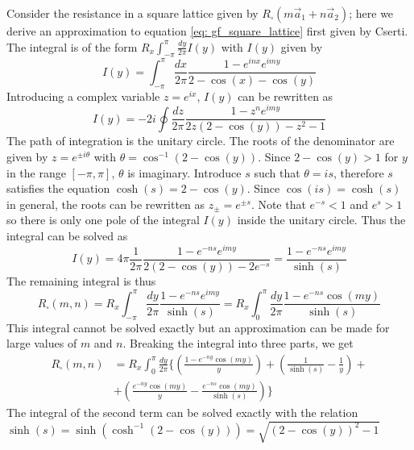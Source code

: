 Consider the resistance in a square lattice given by $R_{\square}(m \vec{a}_1 + n \vec{a}_2)$; here we derive an approximation to equation \ref{eq: gf_square_lattice} first given by Cserti\cite{cserti2000}. The integral is of the form $R_x \int_{-\pi}^{\pi} \frac{dy}{2 \pi}I(y)$ with $I(y)$ given by 
\begin{equation}
I(y) = \int_{-\pi}^{\pi} \frac{d x}{2 \pi}\frac{1 - e^{i n x}e^{i m y}}{2 - \cos(x) - \cos(y)}
\end{equation}
Introducing a complex variable $z = e^{i x}$, $I(y)$ can be rewritten as 
\begin{equation}
I(y) = - 2 i \oint \frac{d z}{2 \pi}\frac{1 - z^n e^{i m y}}{2z(2 - \cos(y)) - z^2 -1}
\end{equation}
The path of integration is the unitary circle. The roots of the denominator are given by $ z = e^{\pm i \theta}$ with $\theta = \cos^{-1}(2 - \cos(y))$. Since $2 - \cos(y)>1$ for $y$ in the range $[-\pi,\pi]$, $\theta$ is imaginary. Introduce $s$ such that $\theta = is$, therefore $s$ satisfies the equation $\cosh(s) = 2 - \cos(y)$. Since $\cos(i s) = \cosh(s)$ in general, the roots can be rewritten as $z_{\pm} = e^{\pm s}$. Note that $e^{-s}<1$ and $e^{s}>1$ so there is only one pole of the integral $I(y)$ inside the unitary circle. Thus the integral can be solved as
\begin{equation}
I(y) = 4 \pi  \frac{1}{2 \pi} \frac{1 - e^{-n s} e^{i m y}}{2(2 - \cos(y)) - 2 e^{-s}} = \frac{1 - e^{-ns} e^{i my}}{\sinh(s)}
\end{equation}
The remaining integral is thus
\begin{equation}
R_{\square}(m,n) = R_x \int_{-\pi}^{\pi}\frac{dy}{2 \pi} \frac{1 - e^{-ns} e^{i m y}}{\sinh(s)} = R_x \int_{0}^{\pi}\frac{dy}{2 \pi} \frac{1 - e^{-ns} \cos( m y)}{\sinh(s)}
\end{equation}
This integral cannot be solved exactly but an approximation can be made for large values of $m$ and $n$. Breaking the integral into three parts, we get 
\begin{align}
R_{\square}(m,n) &= R_x \int_{0}^{\pi}\frac{dy}{2 \pi} \Bigg \{ \left(\frac{1 - e^{-ny}\cos(my)}{y} \right) + \left(\frac{1}{\sinh(s)} - \frac{1}{y} \right) + \\ \nonumber
 &+ \left(\frac{ e^{-ny}\cos(my)}{y} - \frac{ e^{-ns}\cos(my)}{\sinh(s)} \right) \Bigg\}
\end{align}
The integral of the second term can be solved exactly with the relation $\sinh(s) = \sinh(\cosh^{-1}(2 - \cos(y))) = \sqrt{(2 - \cos(y))^2 - 1}$
